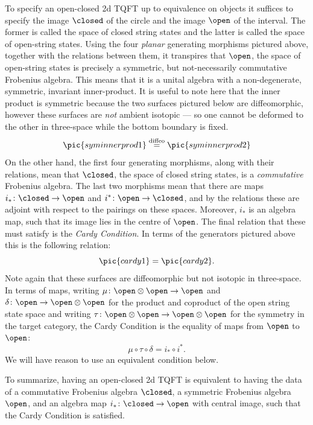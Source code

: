 To specify an open-closed 2d TQFT up to equivalence on objects it
suffices to specify the image $\closed$ of the circle and the image
$\open$ of the interval.  The former is called the space of closed
string states and the latter is called the space of open-string
states.  Using the four \emph{planar} generating morphisms pictured
above, together with the relations between them, it transpires that
$\open$, the space of open-string states is precisely a symmetric, but
not-necessarily commutative Frobenius algebra. This means that it is a
unital algebra with a non-degenerate, symmetric, invariant
inner-product.  It is useful to note here that the inner product is
symmetric because the two surfaces pictured below are diffeomorphic,
however these surfaces are \emph{not} ambient isotopic --- so one
cannot be deformed to the other in three-space while the bottom
boundary is fixed.
\[\pic{syminnerprod1}\stackrel{\text{diffeo}}{=}\pic{syminnerprod2}\]
On the other hand, the first four generating morphisms, along with
their relations, mean that $\closed$, the space of closed string
states, is a \emph{commutative} Frobenius algebra. The last two
morphisms mean that there are maps $i_*\colon \closed\to\open$ and
$i^*\colon \open \to \closed$, and by the relations these are adjoint
with respect to the pairings on these spaces.  Moreover, $i_*$ is an
algebra map, such that its image lies in the centre of $\open$. The
final relation that these must satisfy is the \emph{Cardy Condition}.
In terms of the generators pictured above this is the following
relation:
\[\pic{cardy1}=\pic{cardy2}.\]
Note again that these surfaces are diffeomorphic but not isotopic in
three-space.  In terms of maps, writing $\mu\colon \open\otimes
\open\to \open$ and $\delta\colon\open\to\open\otimes\open$ for the
product and coproduct of the open string state space and writing
$\tau\colon\open\otimes\open\to\open\otimes\open$ for the symmetry in
the target category, the Cardy Condition is the equality of maps from
$\open$ to $\open$:
\[\mu\circ \tau\circ \delta=i_*\circ i^*.\]
We will have reason to use an equivalent condition below.


To summarize, having an open-closed 2d TQFT is equivalent to having
the data of a commutative Frobenius algebra $\closed$, a symmetric
Frobenius algebra $\open$, and an algebra map $i_*\colon \closed \to
\open$ with central image, such that the Cardy Condition is satisfied.

